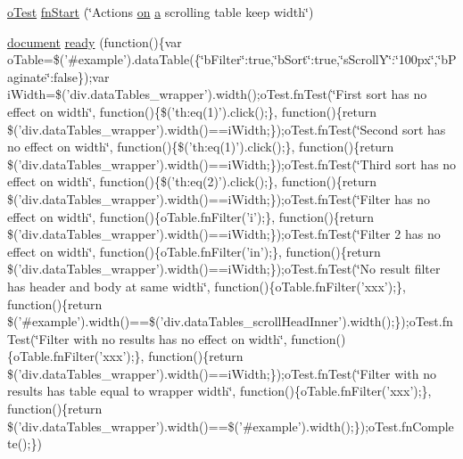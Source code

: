 \begin{DoxyCompactItemize}
\item 
\hyperlink{unit__test_8js_a3b2d259e2df3b6860d9047a92d09d0d6}{o\+Test} \hyperlink{6776-scrolling-table-grows_8js_a0c3a9bb653dea3fb4a0c710cd6e4b545}{fn\+Start} (\char`\"{}Actions \hyperlink{fullpage_2plugin_8min_8js_a1cfa98b7fed2aaf9fee3b68dbb7f9497}{on} \hyperlink{media_2js_2jquery_8js_aa4d4888597588a84fd5b1184d00c91f3}{a} scrolling table keep width\char`\"{})
\item 
\hyperlink{outside_events_8js_aa14f8e0338cced6720590fd2ea13bd4b}{document} \hyperlink{6776-scrolling-table-grows_8js_ab0e99c50de15c91c39f23332d75ea19d}{ready} (function()\{var o\+Table=\$('\#example').data\+Table(\{\char`\"{}b\+Filter\char`\"{}\+:true,\char`\"{}b\+Sort\char`\"{}\+:true,\char`\"{}s\+Scroll\+Y\char`\"{}\+:\char`\"{}100px\char`\"{},\char`\"{}b\+Paginate\char`\"{}\+:false\});var i\+Width=\$('div.\+data\+Tables\+\_\+wrapper').\+width();o\+Test.\+fn\+Test(\char`\"{}\+First sort has no effect on width\char`\"{}, function()\{\$('th\+:eq(1)').\+click();\}, function()\{return \$('div.\+data\+Tables\+\_\+wrapper').\+width()==i\+Width;\});o\+Test.\+fn\+Test(\char`\"{}\+Second sort has no effect on width\char`\"{}, function()\{\$('th\+:eq(1)').\+click();\}, function()\{return \$('div.\+data\+Tables\+\_\+wrapper').\+width()==i\+Width;\});o\+Test.\+fn\+Test(\char`\"{}\+Third sort has no effect on width\char`\"{}, function()\{\$('th\+:eq(2)').\+click();\}, function()\{return \$('div.\+data\+Tables\+\_\+wrapper').\+width()==i\+Width;\});o\+Test.\+fn\+Test(\char`\"{}\+Filter has no effect on width\char`\"{}, function()\{o\+Table.\+fn\+Filter('i');\}, function()\{return \$('div.\+data\+Tables\+\_\+wrapper').\+width()==i\+Width;\});o\+Test.\+fn\+Test(\char`\"{}\+Filter 2 has no effect on width\char`\"{}, function()\{o\+Table.\+fn\+Filter('in');\}, function()\{return \$('div.\+data\+Tables\+\_\+wrapper').\+width()==i\+Width;\});o\+Test.\+fn\+Test(\char`\"{}\+No result filter has header and body at same width\char`\"{}, function()\{o\+Table.\+fn\+Filter('xxx');\}, function()\{return \$('\#example').\+width()==\$('div.\+data\+Tables\+\_\+scroll\+Head\+Inner').\+width();\});o\+Test.\+fn\+Test(\char`\"{}\+Filter with no results has no effect on width\char`\"{}, function()\{o\+Table.\+fn\+Filter('xxx');\}, function()\{return \$('div.\+data\+Tables\+\_\+wrapper').\+width()==i\+Width;\});o\+Test.\+fn\+Test(\char`\"{}\+Filter with no results has table equal to wrapper width\char`\"{}, function()\{o\+Table.\+fn\+Filter('xxx');\}, function()\{return \$('div.\+data\+Tables\+\_\+wrapper').\+width()==\$('\#example').\+width();\});o\+Test.\+fn\+Complete();\})
\end{DoxyCompactItemize}


